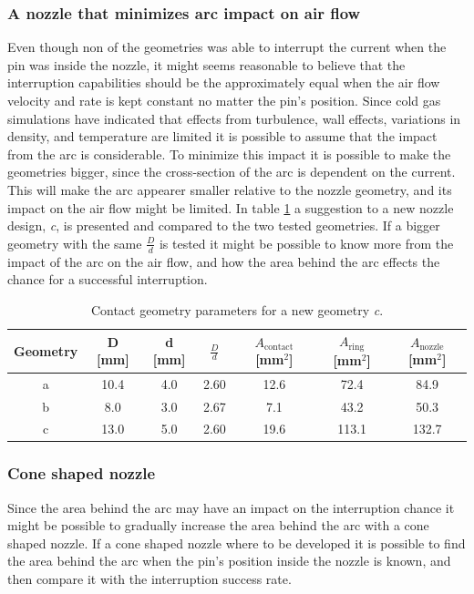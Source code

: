 \documentclass[10pt,a4paper,twoside]{article}
\begin{document}
\subsubsection{A nozzle that minimizes arc impact on air flow}
Even though non of the geometries was able to interrupt the current when the pin was inside the nozzle, it might seems reasonable to believe that the interruption capabilities should be the approximately equal when the air flow velocity and rate is kept constant no matter the pin's position. Since cold gas simulations have indicated that effects from turbulence, wall effects, variations in density, and temperature are limited it is possible to assume that the impact from the arc is considerable. To minimize this impact it is possible to make the geometries bigger, since the cross-section of the arc is dependent on the current. This will make the arc appearer smaller relative to the nozzle geometry, and its impact on the air flow might be limited. In table \ref{tab:contGeoParaNew} a suggestion to a new nozzle design, \textit{c}, is presented and compared to the two tested geometries. If a bigger geometry with the same $\frac{D}{d}$ is tested it might be possible to know more from the impact of the arc on the air flow, and how the area behind the arc effects the chance for a successful interruption.

\begin{table}[H]
\center
\caption{Contact geometry parameters for a new geometry \textit{c}.}
 \begin{tabular}{|c|c|c|c|c|c|c|}
\hline 
Geometry & D [mm] & d [mm] & $\frac{D}{d}$ & $A_\mathrm{{contact}}$ [mm$^2$] & $A_\mathrm{{ring}}$ [mm$^2$] & $A_\mathrm{{nozzle}}$ [mm$^2$] \\ 
\hline 
a & 10.4 & 4.0 & 2.60 & 12.6 & 72.4 & 84.9 \\ 
\hline 
b & 8.0 & 3.0 & 2.67 & 7.1 & 43.2 & 50.3 \\ 
\hline 
c & 13.0 & 5.0 & 2.60 & 19.6 & 113.1 & 132.7 \\ 
\hline
\end{tabular} 
\label{tab:contGeoParaNew}
\end{table}

\subsubsection{Cone shaped nozzle}
Since the area behind the arc may have an impact on the interruption chance it might be possible to gradually increase the area behind the arc with a cone shaped nozzle. If a cone shaped nozzle where to be developed it is possible to find the area behind the arc when the pin's position inside the nozzle is known, and then compare it with the interruption success rate.
\end{document}
